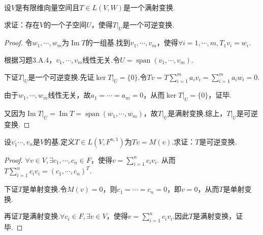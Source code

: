 \begin{comment}
    下证\(T_1=ST_2R\).\(\forall v=\sum_{i=1}^m a_iv_i^\alpha+\sum_{j=1}^n b_ju_j^\alpha\)，
    \begin{align*}
        (ST_2R)v&=(ST_2R)(\sum_{i=1}^m a_iv_i^\alpha+\sum_{j=1}^n b_ju_j^\alpha)
                =(ST_2)(\sum_{i=1}^m a_iRv_i^\alpha+\sum_{j=1}^n b_jRu_j^\alpha) \\
                &=(ST_2)(\sum_{i=1}^m a_iv_i^\beta+\sum_{j=1}^n b_ju_j^\beta)
                =S(\sum_{i=1}^m a_iT_2v_i^\beta+\sum_{j=1}^n b_jT_2u_j^\beta) \\
                &=\sum_{j=1}^n b_jS(T_2u_j^\beta)=\sum_{j=1}^n b_jT_1u_j^\alpha
                =T_1(\sum_{i=1}^m a_iv_i^\alpha+\sum_{j=1}^n b_ju_j^\alpha)=T_1v
    \end{align*}
    故\(\forall v \in V,T_1v=(ST_2R)v\)，即\(T_1=ST_2R\)，证毕.
\end{proof}
\end{comment}

\begin{problem}[8]\label{3.D.8}
    设\(V\)是有限维向量空间且\(T \in L(V,W)\)是一个满射变换.

    求证：存在\(V\)的一个子空间\(U\)，使得\(T|_U\)是一个可逆变换.    
\end{problem}

\begin{proof}
    令\(w_1,\cdots,w_m\)为\(\operatorname{Im} T\)的一组基.找到\(v_1,\cdots,v_m\)，使得\(\forall i=1,\cdots,m,T_1v_i=w_i\).

    根据习题3.A.4，\(v_1,\cdots,v_m\)线性无关.令\(U=\operatorname{span} (v_1,\cdots,v_m)\).
    
    下证\(T|_U\)是一个可逆变换.先证\(\ker T|_U=\{0\}\).令\(Tv=T\sum_{i=1}^m a_iv_i=\sum_{i=1}^m a_iw_i=0\).
    
    由于\(w_1,\cdots,w_m\)线性无关，故\(a_1=\cdots=a_m=0\)，从而\(\ker T|_U=\{0\}\)，证毕.
    
    又因为\(\operatorname{Im} T|_U=\operatorname{Im} T=\operatorname{span} (w_1,\cdots,w_m)\)，故\(T|_U\)是满射变换.综上，\(T|_U\)是可逆变换.
\end{proof}

\newpage

\begin{problem}[14]
    设\(v_1^,\cdots,v_n\)是\(V\)的基.定义\(T \in L(V,F^{n,1})\)为\(Tv=M(v)\).求证：\(T\)是可逆变换.    
\end{problem}

\begin{proof}
    \(\forall v \in V,\exists c_1,\cdots,c_n \in F\)，使得\(v=\sum_{i=1}^n c_iv_i\).
    从而\(T\sum_{i=1}^n c_iv_i=(c_1,\cdots,c_n)^T\).

    下证\(T\)是单射变换.令\(M(v)=0\)，则\(c_1=\cdots=c_n=0\)，即\(v=0\)，从而\(T\)是单射变换.

    再证\(T\)是满射变换.\(\forall c_i \in F,\exists v \in V\)，使得\(v=\sum_{i=1}^n c_iv_i\).因此\(T\)是满射变换，证毕.
\end{proof}

